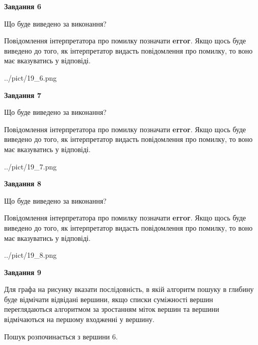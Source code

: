 \documentclass[12pt, ukrainian]{article}
\begin{document}
{\begin {large}
{\begin {center}\textbf{Завдання 6}\end {center}}\par
Що буде виведено за виконання?

Повідомлення інтерпретатора про помилку позначати \textbf{error}.
Якщо щось буде виведено до того, як інтерпретатор видасть повідомлення про помилку, 
то воно має вказуватись у відповіді. \par


\begin{center}
	{../pict/19_6.png}
\end{center}
\newpage

{\begin {center}\textbf{Завдання 7}\end {center}}\par
Що буде виведено за виконання?

Повідомлення інтерпретатора про помилку позначати \textbf{error}.
Якщо щось буде виведено до того, як інтерпретатор видасть повідомлення про помилку, 
то воно має вказуватись у відповіді. \par


\begin{center}
	{../pict/19_7.png}
\end{center}
\newpage

{\begin {center}\textbf{Завдання 8}\end {center}}\par
Що буде виведено за виконання?

Повідомлення інтерпретатора про помилку позначати \textbf{error}.
Якщо щось буде виведено до того, як інтерпретатор видасть повідомлення про помилку, 
то воно має вказуватись у відповіді. \par


\begin{center}
	{../pict/19_8.png}
\end{center}
\newpage

{\begin {center}\textbf{Завдання 9}\end {center}}\par
Для графа на рисунку вказати послідовність, в якій алгоритм пошуку в глибину буде відмічати відвідані вершини, якщо списки суміжності вершин переглядаються алгоритмом за зростанням міток вершин та вершини відмічаються на першому вход\-женні у вершину.\par
Пошук розпочинається з вершини 6.\par


\end{large}}
\end{document}
